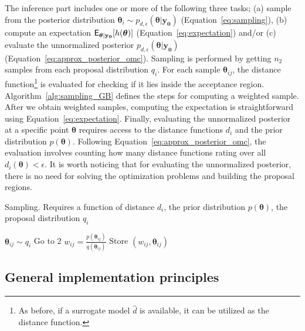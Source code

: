 \documentclass[article]{jss}
\newcommand{\thetab}{\boldsymbol{\theta}}
\newcommand{\data}{\mathbf{y_0}}
\begin{document}
The inference part includes one or more of the following three tasks;
(a) sample from the posterior distribution
\( \thetab_i \sim p_{d, \epsilon}(\thetab|\data)\)
(Equation~\ref{eq:sampling}), (b) compute an expectation
\(\E_{\thetab|\data}[h(\thetab)]\) (Equation~\ref{eq:expectation})
and/or (c) evaluate the unnormalized posterior
\(p_{d, \epsilon}(\thetab|\data)\)
(Equation~\ref{eq:approx_posterior_omc}). Sampling is performed by
getting \(n_2\) samples from each proposal distribution \(q_i\). For
each sample \(\thetab_{ij}\), the distance function\footnote{As
  before, if a surrogate model \(\hat{d}\) is available, it can be
  utilized as the distance function.} is evaluated for checking if it
lies inside the acceptance region. Algorithm~\ref{alg:sampling_GB}
defines the steps for computing a weighted sample. After we obtain
weighted samples, computing the expectation is straightforward using
Equation~\ref{eq:expectation}. Finally, evaluating the unnormalized
posterior at a specific point \(\thetab\) requires access to the
distance functions \(d_i\) and the prior distribution
\(p(\thetab)\). Following Equation~\ref{eq:approx_posterior_omc}, the
evaluation involves counting how many distance functions rating over
all \(d_i(\thetab) < \epsilon\). It is worth noticing that for
evaluating the unnormalized posterior, there is no need for solving
the optimization problems and building the proposal regions.

\begin{algorithm}[H]
    \centering
    \caption{Sampling. Requires a function of distance \(d_i\), the prior distribution \(p(\thetab)\), the proposal distribution \(q_i\)}\label{alg:sampling_GB}
    \begin{algorithmic}[1]
      \State \(\thetab_{ij} \sim q_i\)
          \If {\(d_i(\thetab_{ij}) > \epsilon\)}
            \State Go to 2 
          \Else {}
            \State \(w_{ij} = \frac{p(\thetab_{ij})}{q(\thetab_{ij})}\) 
            \State Store \((w_{ij}, \thetab_{ij})\) 
          \EndIf
    \end{algorithmic}
\end{algorithm}


\subsection{General implementation principles}
\label{subsec:general_design}


\end{document}
